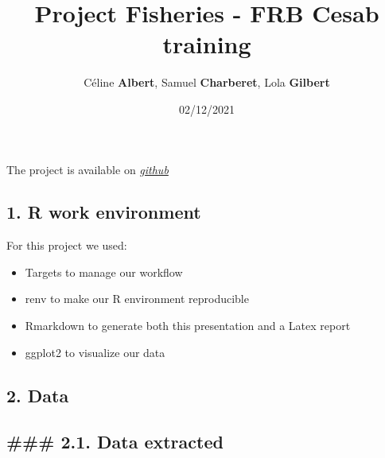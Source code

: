 \documentclass[
]{article}
\title{\textbf{Project Fisheries - FRB Cesab training}}
\author{Céline \textbf{Albert}, Samuel \textbf{Charberet}, Lola
\textbf{Gilbert}}
\date{02/12/2021}
\providecommand{\tightlist}{%
  \setlength{\itemsep}{0pt}\setlength{\parskip}{0pt}}
\begin{document}
\maketitle

The project is available on
\emph{\href{https://github.com/samuelcharberet/project.frb.fisheries}{github}}

\hypertarget{r-work-environment}{%
\subsection{1. R work environment}\label{r-work-environment}}

For this project we used:

\begin{itemize}
\tightlist
\item
  Targets to manage our workflow
\item
  renv to make our R environment reproducible
\item
  Rmarkdown to generate both this presentation and a Latex report
\item
  ggplot2 to visualize our data
\end{itemize}

\hypertarget{data}{%
\subsection{2. Data}\label{data}}

\hypertarget{data-extracted}{%
\subsection{\#\#\# 2.1. Data extracted}\label{data-extracted}}
\end{document}
